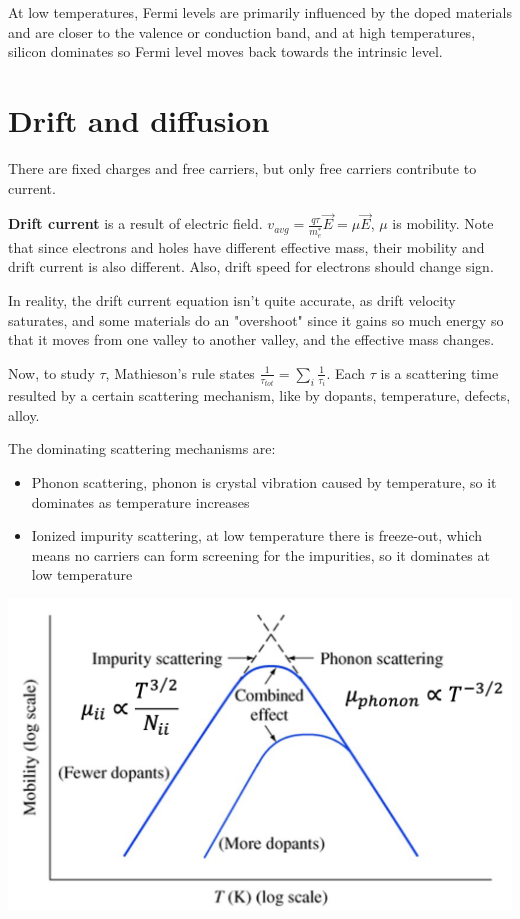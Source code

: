 \documentclass[a4paper,10pt]{article}
\begin{document}
\begin{multicols}{3}
At low temperatures, Fermi levels are primarily influenced by the doped materials and are closer to the valence or conduction band, and at high temperatures, silicon dominates so Fermi level moves back towards the intrinsic level.

\section*{Drift and diffusion}

There are fixed charges and free carriers, but only free carriers contribute to current.

\textbf{Drift current} is a result of electric field. $v_{avg} = \frac{q\tau}{m_{e}^{*}}\vec{E} = \mu \vec{E}$, $\mu$ is mobility. Note that since electrons and holes have different effective mass, their mobility and drift current is also different. Also, drift speed for electrons should change sign.

In reality, the drift current equation isn't quite accurate, as drift velocity saturates, and some materials do an "overshoot" since it gains so much energy so that it moves from one valley to another valley, and the effective mass changes.

Now, to study $\tau$, Mathieson's rule states $\frac{1}{\tau_{tot}} = \sum_{i} \frac{1}{\tau_{i}}$. Each $\tau$ is a scattering time resulted by a certain scattering mechanism, like by dopants, temperature, defects, alloy.

The dominating scattering mechanisms are:

\begin{itemize}[noitemsep, topsep=0pt, left=0pt]
    \item Phonon scattering, phonon is crystal vibration caused by temperature, so it dominates as temperature increases
    \item Ionized impurity scattering, at low temperature there is freeze-out, which means no carriers can form screening for the impurities, so it dominates at low temperature
\end{itemize}

\begin{center}
    \includegraphics[width=\columnwidth]{../img/Pasted image 20241017111548.png}
\end{center}


\end{multicols}
\end{document}
